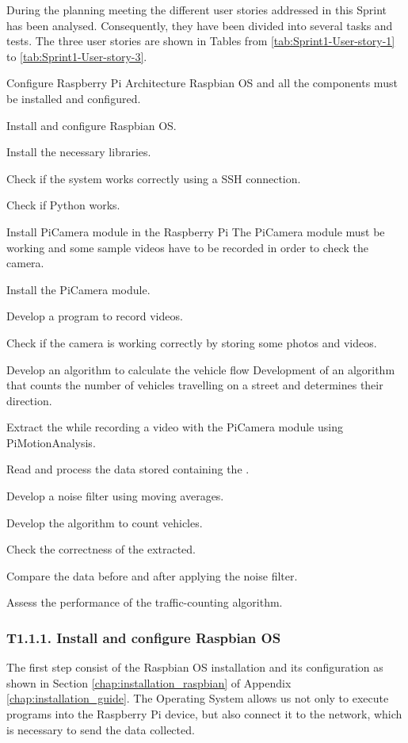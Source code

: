 During the planning meeting the different user stories addressed in this Sprint has been analysed. Consequently, they have been divided into several tasks and tests. The three user stories are shown in Tables from \ref{tab:Sprint1-User-story-1} to \ref{tab:Sprint1-User-story-3}.

{Configure Raspberry Pi Architecture}
{Raspbian \ac{OS} and all the components must be installed and configured.}
{	\item Install and configure Raspbian \ac{OS}.
	\item Install the necessary libraries.
}{	\item Check if the system works correctly using a SSH connection.
	\item Check if Python works.
}

{Install PiCamera module in the Raspberry Pi}
{The PiCamera module must be working and some sample videos have to be recorded in order to check the camera.}
{	\item Install the PiCamera module.
	\item Develop a program to record videos.
}{	\item Check if the camera is working correctly by storing some photos and videos.
}

{Develop an algorithm to calculate the vehicle flow}
{Development of an algorithm that counts the number of vehicles travelling on a street and determines their direction.}
{	\item Extract the  while recording a video with the PiCamera module using PiMotionAnalysis.
	\item Read and process the data stored containing the .
	\item Develop a noise filter using moving averages.
	\item Develop the algorithm to count vehicles.
}{	\item Check the correctness of the  extracted.
	\item Compare the data before and after applying the noise filter.
	\item Assess the performance of the traffic-counting algorithm.
}

\subsubsection{T1.1.1. Install and configure Raspbian \ac{OS}}
The first step consist of the Raspbian \ac{OS} installation and its configuration as shown in Section \ref{chap:installation_raspbian} of Appendix \ref{chap:installation_guide}. The Operating System allows us not only to execute programs into the Raspberry Pi device, but also connect it to the network, which is necessary to send the data collected.


